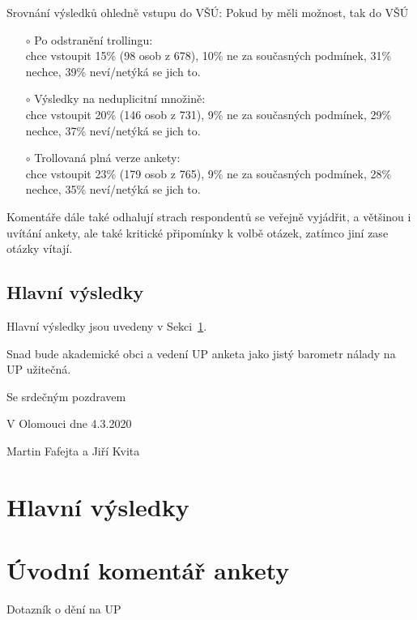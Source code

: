 \documentclass[a4paper,twoside]{article}
\begin{document}
\begin{itemize}
{\bf 
  \item Srovnání výsledků ohledně vstupu do VŠÚ: Pokud by měli možnost, tak do VŠÚ
    \begin{itemize}
       \item[$\circ$] Po odstranění trollingu:
       \\  chce vstoupit 15\% (98 osob z 678), 10\% ne za současných podmínek, 31\% nechce, 39\% neví/netýká se jich to.
       \item[$\circ$] Výsledky na neduplicitní množině:
       \\  chce vstoupit 20\% (146 osob z 731), 9\% ne za současných podmínek, 29\% nechce, 37\% neví/netýká se jich to.
       \item[$\circ$] Trollovaná plná verze ankety:
         \\ chce vstoupit 23\% (179 osob z 765), 9\% ne za současných podmínek, 28\% nechce, 35\% neví/netýká se jich to.
    \end{itemize}
}
  \item Komentáře dále také odhalují strach respondentů se veřejně vyjádřit, a většinou i uvítání ankety, ale také kritické připomínky k volbě otázek, zatímco jiní zase otázky vítají.
\end{itemize}

\subsection{Hlavní výsledky}
Hlavní výsledky jsou uvedeny v Sekci~\ref{sec:results}.

\bigskip

\noindent Snad bude akademické obci a vedení UP anketa jako jistý barometr nálady na UP užitečná.

\bigskip

Se srdečným pozdravem

V Olomouci dne 4.3.2020

Martin Fafejta a Jiří Kvita


\newpage
\section{Hlavní výsledky}
\label{sec:results}



\appendix

\newpage
\section{Úvodní komentář ankety}
Dotazník o dění na UP
\end{document}

